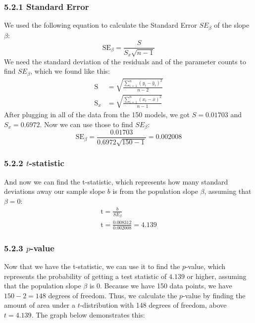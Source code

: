 \documentclass[12pt]{article}
\begin{document}
    \subsubsection*{5.2.1 Standard Error}

    We used the following equation to calculate the Standard Error $SE_\beta$ of the slope $\beta$:
    \[
        \mathrm{SE}_{\beta}
        =
        \frac{
            \displaystyle S
        }{
            \displaystyle S_x \sqrt{n - 1}
        }
    \]
    \noindent We need the standard deviation of the residuals and of the parameter counts to find $SE_\beta$, which we found like this:
    \begin{align*}
        \mathrm{S} &=
        \sqrt{
            \frac{
                \sum_{i=1}^n (y_i - \hat{y}_i)^2
            }{
                n - 2
            }
        } \\[1em]
        \mathrm{S}_x &=
        \sqrt{
            \frac{
                \sum_{i=1}^n (x_i - \bar{x})^2
            }{
                n - 1
            }
        }
    \end{align*}
    \noindent After plugging in all of the data from the 150 models, we got $S = 0.01703$ and $S_x = 0.6972$.
    Now we can use those to find $SE_\beta$:
    \[
        \mathrm{SE}_{\beta}
        =
        \frac{
            \displaystyle 0.01703
        }{
            \displaystyle 0.6972 \sqrt{150 - 1}
        }
        =
        0.002008
    \]

    \subsubsection*{5.2.2 $t$-statistic}
    \noindent And now we can find the t-statistic, which represents how many standard deviations away our sample slope $b$ is from the population slope $\beta$, assuming that $\beta=0$:
    \begin{gather*}
        \mathrm{t} = \frac{b}{SE_\beta} \\[1em]
        \mathrm{t} = \frac{0.008312}{0.002008} = 4.139
    \end{gather*}

    \subsubsection*{5.2.3 $p$-value}
    \noindent Now that we have the t-statistic, we can use it to find the $p$-value, which represents the probability of getting a test statistic
    of $4.139$ or higher, assuming that the population slope $\beta$ is $0$. Because we have 150 data points, we have $150 - 2 = 148$ degrees of freedom.
    Thus, we calculate the $p$-value by finding the amount of area under a $t$-distribution with 148 degrees of freedom, above $t=4.139$. The graph below demonstrates this:
\end{document}
